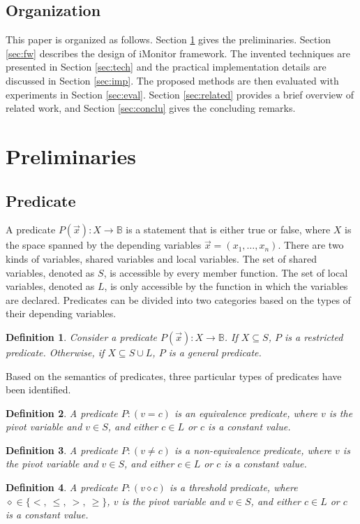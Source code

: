 \documentclass[preprint]{sigplanconf}
\newtheorem{definition}{Definition}
\begin{document}
\subsection{Organization}
This paper is organized as follows. Section \ref{sec:pre} gives the
preliminaries. Section \ref{sec:fw} describes the design of iMonitor
framework. The invented techniques are presented in Section \ref{sec:tech}
and the practical implementation details are discussed in Section 
\ref{sec:imp}. The proposed methods are then evaluated with experiments in 
Section \ref{sec:eval}. Section \ref{sec:related} provides a brief overview of
related work, and Section \ref{sec:conclu} gives the concluding remarks.

\section{Preliminaries} \label{sec:pre}
\subsection{Predicate}
A predicate $P(\vec{x}): X \rightarrow \mathbb{B}$ is a statement that is 
either true or false, where $X$ is the space spanned by the depending variables 
$\vec{x}=(x_1, \dots, x_n)$. There are two kinds of
variables, shared variables and local variables. The set of shared variables, 
denoted as $S$, is accessible by every member function. The set of local 
variables, denoted as $L$, is only accessible by the function in which the
variables are declared. 
Predicates can be divided into two categories based on the types of their 
depending variables.
\begin{definition}
    Consider a predicate $P(\vec{x}): X \rightarrow \mathbb{B}$. If $X 
    \subseteq S$, $P$ 
    is a restricted predicate. Otherwise, if $X \subseteq S \cup L$, $P$ 
    is a general predicate. 
\end{definition}

Based on the semantics of predicates, three particular types of predicates have 
been identified. 
\begin{definition}
    A predicate $P: (v = c)$ is an equivalence predicate, where $v$ is the
    pivot variable and $v \in S$, and either $c \in L$ or $c$ is a constant 
    value.
\end{definition}
\begin{definition}
    A predicate $P: (v \neq c)$ is a non-equivalence predicate, where $v$ is the
    pivot variable and $v \in S$, and either $c \in L$ or $c$ is a constant 
    value.
\end{definition}
\begin{definition}
    A predicate $P: (v \diamond c)$ is a threshold predicate, where $\diamond 
    \in \{<,\ \le,\ >,\ \ge\}$, $v$ is the pivot variable and $v \in S$, and 
    either $c \in L$ or $c$ is a constant value.
\end{definition}
\end{document}
